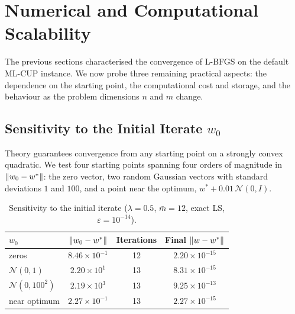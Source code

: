 \section{Numerical and Computational Scalability}
\label{sec:exp_scalability}

\noindent The previous sections characterised the convergence of L-BFGS on the
default ML-CUP instance. We now probe three remaining practical aspects: the
dependence on the starting point, the computational cost and storage, and
the behaviour as the problem dimensions $n$ and $m$ change.


\subsection{Sensitivity to the Initial Iterate $w_0$}
\label{sec:exp_init}

\noindent Theory guarantees convergence from any starting point on a strongly
convex quadratic. We test four starting points spanning four orders of
magnitude in $\left\|w_0 - w^*\right\|$: the zero vector, two random Gaussian vectors
with standard deviations $1$ and $100$, and a point near the optimum,
$w^* + 0.01\,\mathcal{N}(0, I)$.

\begin{table}[H]
\centering
\caption{Sensitivity to the initial iterate
  ($\lambda = 0.5$, $\bar{m} = 12$, exact LS, $\varepsilon = 10^{-14}$).}
\label{tab:init_sensitivity}
\small
\setlength{\tabcolsep}{12pt}
\begin{tabular}{lccc}
    \toprule
    $w_0$ & $\left\|w_0 - w^*\right\|$ & \textbf{Iterations} & \textbf{Final} $\left\|w - w^*\right\|$ \\
    \midrule
    zeros                    & $8.46 \times 10^{-1}$ & 12 & $2.20 \times 10^{-15}$ \\
    $\mathcal{N}(0, 1)$      & $2.20 \times 10^{1}$  & 13 & $8.31 \times 10^{-15}$ \\
    $\mathcal{N}(0, 100^2)$  & $2.19 \times 10^{3}$  & 13 & $9.25 \times 10^{-13}$ \\
    near optimum             & $2.27 \times 10^{-1}$ & 13 & $2.27 \times 10^{-15}$ \\
    \bottomrule
\end{tabular}
\end{table}

